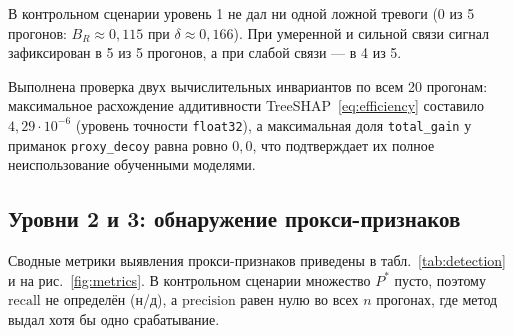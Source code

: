\documentclass{misisarticle}
\begin{document}
В контрольном сценарии уровень 1 не дал ни одной ложной тревоги (0 из 5 прогонов: $B_R \approx 0{,}115$ при $\delta \approx 0{,}166$). При умеренной и сильной связи сигнал зафиксирован в 5 из 5 прогонов, а при слабой связи — в 4 из 5.

Выполнена проверка двух вычислительных инвариантов по всем 20 прогонам: максимальное расхождение аддитивности TreeSHAP~\eqref{eq:efficiency} составило $4{,}29 \cdot 10^{-6}$ (уровень точности \texttt{float32}), а максимальная доля \texttt{total\_gain} у приманок \texttt{proxy\_decoy} равна ровно $0{,}0$, что подтверждает их полное неиспользование обученными моделями.

\subsection{Уровни 2 и 3: обнаружение прокси-признаков}

Сводные метрики выявления прокси-признаков приведены в табл.~\ref{tab:detection} и на рис.~\ref{fig:metrics}. В контрольном сценарии множество $P^*$ пусто, поэтому $\text{recall}$ не определён (н/д), а $\text{precision}$ равен нулю во всех $n$ прогонах, где метод выдал хотя бы одно срабатывание.
\end{document}
